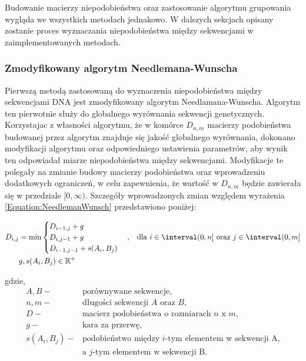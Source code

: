         Budowanie macierzy niepodobieństwa oraz zastosowanie algorytmu grupowania wygląda we wszystkich metodach jednakowo. W dalszych sekcjach opisany zostanie proces wyznaczania niepodobieństwa między sekwencjami w zaimplementowanych metodach.
        
        \subsubsection{Zmodyfikowany algorytm Needlemana-Wunscha}

            Pierwszą metodą zastosowaną do wyznaczenia niepodobieństwa między sekwencjami DNA jest  zmodyfikowany algorytm Needlamana-Wunscha. Algorytm ten pierwotnie służy do globalnego wyrównania sekwencji genetycznych. Korzystajac z własności algorytmu, że w komórce $D_{n, m}$ macierzy podobieństwa budowanej przez algorytm znajduje się jakość globalnego wyrównania, dokonano modyfikacji algorytmu oraz odpowiedniego ustawienia parametrów, aby wynik ten odpowiadał miarze niepodobieństwa między sekwencjami. Modyfikacje te polegały na zmianie budowy macierzy podobieństwa oraz wprowadzeniu dodatkowych ograniczeń, w celu zapewnienia, że wartość w $D_{n, m}$ będzie zawierała się w przedziale $[0, \infty)$. Szczegóły wprowadzonych zmian względem wyrażenia \eqref{Equation:NeedlemanWunsch} przedstawiono poniżej:

            \begin{equation}
                \begin{aligned}
                    D_{i,j} &= \min
                    \begin{cases}
                    D_{i - 1, j} + g \\
                    D_{i, j - 1} + g \\
                    D_{i - 1, j - 1} + s(A_i, B_j)
                    \end{cases}, & \text{dla } & i \in \interval({0, n}] \text{ oraz } j \in \interval({0, m}] \\
                    & g, s(A_i, B_j) \in \mathbb{R}^{+}
                \end{aligned}
            \end{equation}

            gdzie,
            \begin{align*} 
                A, B -& \text{porównywane sekwencje}, \\
                n, m -& \text{długości sekwencji } A \text{ oraz } B, \\
                D -& \text{macierz podobieństwa o rozmiarach } n \text{ x } m, \\
                g -& \text{kara za przerwę}, \\
                s(A_i, B_j) -& \text{podobieństwo między  } i\text{-tym elementem w sekwencji A,} \\ 
                & \text{a } j \text{-tym elementem w sekwencji B}. \\
            \end{align*}


